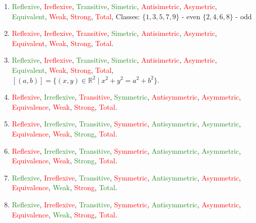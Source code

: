 \documentclass[12pt]{article}
\newcommand{\T}[1]{\textcolor{ForestGreen}{#1}}
\newcommand{\F}[1]{\textcolor{red}{#1}}
\begin{document}
\begin{enumerate}[label=\alph*)]
    \item \textcolor{ForestGreen}{Reflexive}, \textcolor{red}{Ireflexive}, \textcolor{ForestGreen}{Transitive}, \textcolor{ForestGreen}{Simetric}, \textcolor{red}{Antisimetric}, \textcolor{red}{Asymetric}, \textcolor{ForestGreen}{Equivalent},  \textcolor{red}{Weak}, \textcolor{red}{Strong}, \textcolor{red}{Total}, Classes: $\{1, 3, 5, 7, 9\}$ - even   $\{2, 4, 6, 8\}$ - odd
    \item \textcolor{Red}{Reflexive}, \textcolor{red}{Ireflexive}, \textcolor{red}{Transitive}, \textcolor{ForestGreen}{Simetric}, \textcolor{red}{Antisimetric}, \textcolor{red}{Asymetric}, \textcolor{red}{Equivalent},  \textcolor{red}{Weak}, \textcolor{red}{Strong}, \textcolor{red}{Total}.
    \item \textcolor{ForestGreen}{Reflexive}, \textcolor{Red}{Ireflexive}, \textcolor{ForestGreen}{Transitive}, \textcolor{ForestGreen}{Simetric}, \textcolor{red}{Antisimetric}, \textcolor{red}{Asymetric}, \textcolor{ForestGreen}{Equivalent},  \textcolor{red}{Weak}, \textcolor{red}{Strong}, \textcolor{red}{Total}, $  [(a,b)] = \{ (x,y)\in\mathbb{R}^2 \mid x^2+y^2 = a^2+b^2 \}.$
    \item\F{Reflexive}, \T{Irreflexive}, \F{Transitive}, \T{Symmetric}, \F{Antisymmetric}, \F{Asymmetric}, \F{Equivalence}, \F{Weak}, \F{Strong}, \F{Total}.
    \item \F{Reflexive}, \T{Irreflexive}, \T{Transitive}, \F{Symmetric}, \T{Antisymmetric}, \T{Asymmetric}, \F{Equivalence}, \F{Weak}, \T{Strong}, \F{Total}.
    \item \F{Reflexive}, \T{Irreflexive}, \T{Transitive}, \F{Symmetric}, \T{Antisymmetric}, \T{Asymmetric}, \F{Equivalence}, \F{Weak}, \T{Strong}, \F{Total}.
    \item \T{Reflexive}, \F{Irreflexive}, \T{Transitive}, \F{Symmetric}, \T{Antisymmetric}, \F{Asymmetric}, \F{Equivalence}, \T{Weak}, \F{Strong}, \T{Total}.
    \item \T{Reflexive}, \F{Irreflexive}, \T{Transitive}, \F{Symmetric}, \T{Antisymmetric}, \F{Asymmetric}, \F{Equivalence}, \T{Weak}, \F{Strong}, \F{Total}.
\end{enumerate}
\end{document}

